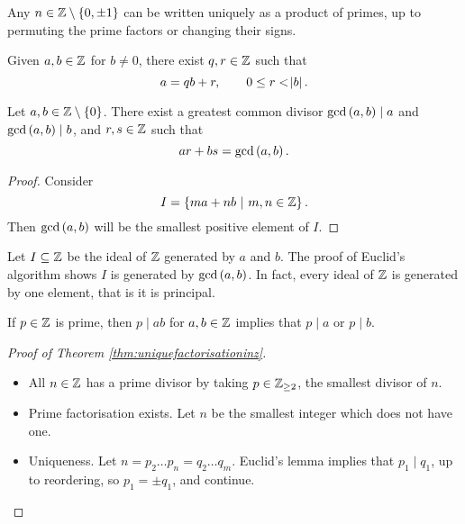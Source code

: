 \begin{theorem}
\label{thm:uniquefactorisationinz}
Any $ n \in \ZZ \setminus \cbr{0, \pm 1} $ can be written uniquely as a product of primes, up to permuting the prime factors or changing their signs.
\end{theorem}

\begin{proposition}
Given $ a, b \in \mathbb{Z} $ for $ b \ne 0 $, there exist $ q, r \in \mathbb{Z} $ such that
$$ a = qb + r, \qquad 0 \le r < \abs{b}. $$
\end{proposition}

\begin{proposition}
Let $ a, b \in \ZZ \setminus \cbr{0} $. There exist a greatest common divisor $ \gcd\br{a, b} \mid a $ and $ \gcd\br{a, b} \mid b $, and $ r, s \in \mathbb{Z} $ such that
$$ ar + bs = \gcd\br{a, b}. $$
\end{proposition}

\begin{proof}
Consider
$$ I = \cbr{ma + nb \st m, n \in \ZZ}. $$
Then $ \gcd\br{a, b} $ will be the smallest positive element of $ I $.
\end{proof}

Let $ I \subseteq \mathbb{Z} $ be the ideal of $ \mathbb{Z} $ generated by $ a $ and $ b $. The proof of Euclid's algorithm shows $ I $ is generated by $ \gcd\br{a, b} $. In fact, every ideal of $ \mathbb{Z} $ is generated by one element, that is it is principal.

\begin{proposition}
If $ p \in \mathbb{Z} $ is prime, then $ p \mid ab $ for $ a, b \in \mathbb{Z} $ implies that $ p \mid a $ or $ p \mid b $.
\end{proposition}

\begin{proof}[Proof of Theorem \ref{thm:uniquefactorisationinz}]
\hfill
\begin{itemize}
\item All $ n \in \mathbb{Z} $ has a prime divisor by taking $ p \in \mathbb{Z}_{\ge 2} $, the smallest divisor of $ n $.
\item Prime factorisation exists. Let $ n $ be the smallest integer which does not have one.
\item Uniqueness. Let $ n = p_2 \dots p_n = q_2 \dots q_m $. Euclid's lemma implies that $ p_1 \mid q_1 $, up to reordering, so $ p_1 = \pm q_1 $, and continue.
\end{itemize}
\end{proof}

